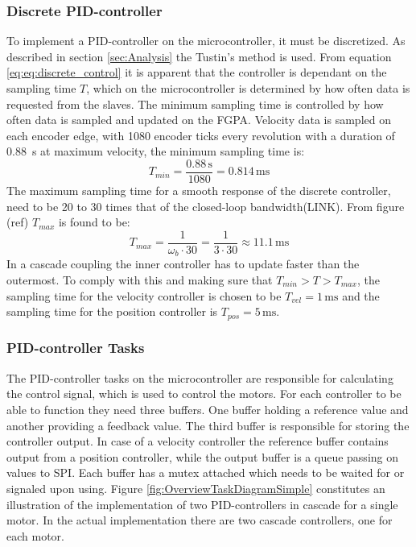 \documentclass[../../main.tex]{subfiles}
\begin{document}
\subsubsection*{Discrete PID-controller}
To implement a PID-controller on the microcontroller, it must be discretized. As described in section \ref{sec:Analysis} the Tustin's method is used.
From equation \ref{eq:eq:discrete_control} it is apparent that the controller is dependant on the sampling time $T$, which on the microcontroller is determined by how often data is requested from the slaves. The minimum sampling time is controlled by how often data is sampled and updated on the FGPA. Velocity data is sampled on each encoder edge, with 1080 encoder ticks every revolution with a duration of \SI{0,88}{\second} \cite{} at maximum velocity, the minimum sampling time is:
\begin{equation}
    T_{min} = \frac{0.88\,\mathrm{s}}{1080} = 0.814\,\mathrm{ms}
\end{equation}
The maximum sampling time for a smooth response of the discrete controller, need to be 20 to 30 times that of the closed-loop bandwidth(LINK). From figure (ref) $T_{max}$ is found to be:
\begin{equation}
    T_{max} = \frac{1}{\omega_b\cdot 30} = \frac{1}{3 \cdot 30} \approx 11.1\,\mathrm{ms}
\end{equation}
In a cascade coupling the inner controller has to update faster than the outermost. To comply with this and making sure that $T_{min} > T > T_{max}$, the sampling time for the velocity controller is chosen to be $T_{vel} = 1\,\mathrm{ms}$ and the sampling time for the position controller is $T_{pos} = 5\,\mathrm{ms}$. \\

\subsubsection*{PID-controller Tasks}
The PID-controller tasks on the microcontroller are responsible for calculating the control signal, which is used to control the motors. For each controller to be able to function they need three buffers. One buffer holding a reference value and another providing a feedback value. The third buffer is responsible for storing the controller output. In case of a velocity controller the reference buffer contains output from a position controller, while the output buffer is a queue passing on values to SPI. Each buffer has a mutex attached which needs to be waited for or signaled upon using. Figure \ref{fig:OverviewTaskDiagramSimple} constitutes an illustration of the implementation of two PID-controllers in cascade for a single motor. In the actual implementation there are two cascade controllers, one for each motor.
\end{document}
